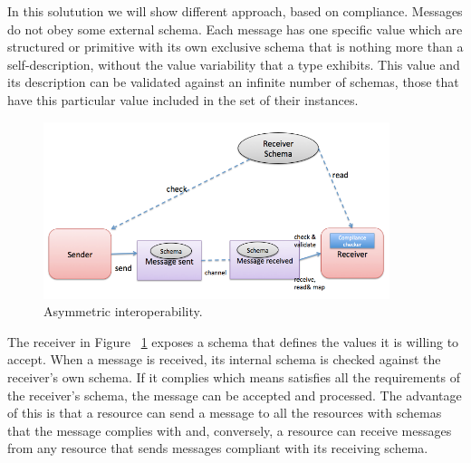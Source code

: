In this solutution we will show different approach, based on compliance. Messages do not obey some external schema.
Each message has one specific value which are structured or primitive with its own exclusive schema that is nothing more than a self-description,
without the value variability that a type exhibits. This value and its description can be validated against an infinite number of schemas, those
that have this particular value included in the set of their instances.\\
\begin{figure}[!htb]
  \centering
  \includegraphics[width=0.9\textwidth]{Figures/asyc.png}
  \caption[Asymmetric interoperability.]{Asymmetric interoperability.}
  \label{fig:Asymmetric}
\end{figure}
The receiver in Figure ~\ref{fig:Asymmetric} exposes a schema that defines the values it is willing to accept.
When a message is received, its internal schema is checked against the receiver’s own schema. If it complies which
means satisfies all the requirements of the receiver’s schema, the message can be accepted and processed. The advantage of this is that a
resource can send a message to all the resources with schemas that the message complies with and, conversely, a
resource can receive messages from any resource that sends messages compliant with its receiving schema.

